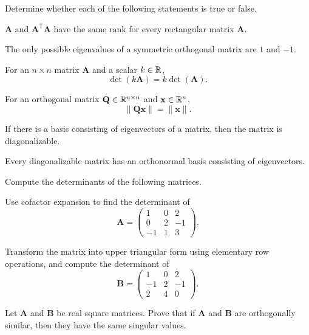 \begin{problem}
Determine whether each of the following statements is true or false.
\begin{problemchoices}
\item $\mathbf A$ and $\mathbf A^{\mathsf T}\mathbf A$ have the same rank for every rectangular matrix $\mathbf A$.
\item The only possible eigenvalues of a symmetric orthogonal matrix are $1$ and $-1$.
\item For an $n\times n$ matrix $\mathbf A$ and a scalar $k\in\mathbb{R}$,
\[
\det(k\mathbf A)=k\det(\mathbf A).
\]
\item For an orthogonal matrix $\mathbf Q\in\mathbb{R}^{n\times n}$ and $\mathbf x\in\mathbb{R}^n$,
\[
\|\mathbf Q\mathbf x\|=\|\mathbf x\|.
\]
\item If there is a basis consisting of eigenvectors of a matrix, then the matrix is diagonalizable.
\item Every diagonalizable matrix has an orthonormal basis consisting of eigenvectors.
\end{problemchoices}
\end{problem}

\begin{problem}
Compute the determinants of the following matrices.
\begin{problemsubparts}
\item Use cofactor expansion to find the determinant of
\[
\mathbf A=
\begin{pmatrix}
1&0&2\\
0&2&-1\\
-1&1&3
\end{pmatrix}.
\]
\item Transform the matrix into upper triangular form using elementary row operations, and compute the determinant of
\[
\mathbf B=
\begin{pmatrix}
1&0&2\\
-1&2&-1\\
2&4&0
\end{pmatrix}.
\]
\end{problemsubparts}
\end{problem}

\begin{problem}
Let $\mathbf A$ and $\mathbf B$ be real square matrices. Prove that if $\mathbf A$ and $\mathbf B$ are orthogonally similar, then they have the same singular values.
\end{problem}

